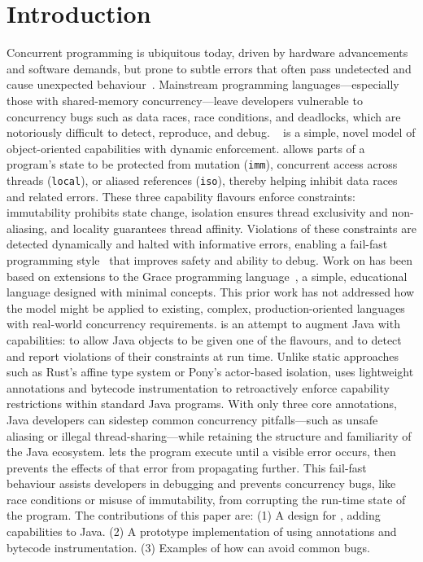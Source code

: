 \section{Introduction}
%
Concurrent programming is ubiquitous today, driven by hardware advancements and software demands, but prone to subtle errors that often pass undetected and cause unexpected behaviour~\cite{lu2008learning,musuvathi2008finding,lin2015jacontebe}. Mainstream programming languages—especially those with shared-memory concurrency—leave developers vulnerable to concurrency bugs such as data races, race conditions, and deadlocks, which are notoriously difficult to detect, reproduce, and debug.
%
\dala~\cite{Dala_Paper,DafnyExperience-Noble2024} is a simple, novel model of object-oriented capabilities with dynamic enforcement. \dala allows parts of a program’s state to be protected from mutation (\texttt{imm}), concurrent access across threads (\texttt{local}), or aliased references (\texttt{iso}), thereby helping inhibit data races and related errors. These three capability flavours enforce constraints: immutability prohibits state change, isolation ensures thread exclusivity and non-aliasing, and locality guarantees thread affinity. Violations of these constraints are detected dynamically and halted with informative errors, enabling a fail-fast programming style~\cite{shore2004fail} that improves safety and ability to debug.
%
Work on \dala has been based on extensions to the Grace programming language~\cite{GraceAbsence-Black2012}, a simple, educational language designed with minimal concepts. This prior work has not addressed how the model might be applied to existing, complex, production-oriented languages with real-world concurrency requirements.
%
\jdala is an attempt to augment Java with \dala capabilities: to allow Java objects to be given one of the \dala flavours, and to detect and report violations of their constraints at run time. Unlike static approaches such as Rust’s affine type system or Pony’s actor-based isolation, \jdala uses lightweight annotations and bytecode instrumentation to retroactively enforce capability restrictions within standard Java programs. With only three core annotations, Java developers can sidestep common concurrency pitfalls—such as unsafe aliasing or illegal thread-sharing—while retaining the structure and familiarity of the Java ecosystem.
%
%
\jdala lets the program execute until a visible error occurs, then prevents the effects of that error from propagating further. This fail-fast behaviour assists developers in debugging and prevents concurrency bugs, like race conditions or misuse of immutability, from corrupting the run-time state of the program.
%
The contributions of this paper are: 
(1) A design for \jdala, adding \dala capabilities to Java.
(2) A prototype implementation of \jdala using annotations and bytecode instrumentation.
(3) Examples of how \jdala can avoid common bugs.
